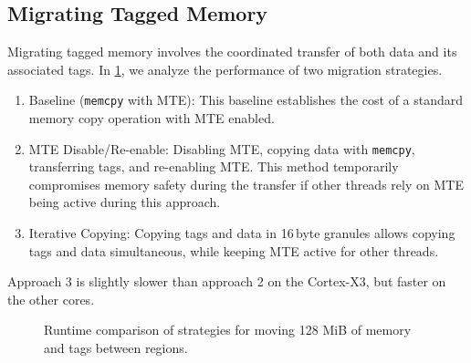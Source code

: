 \subsection{Migrating Tagged Memory}
\label{subsec:migrating-tagged-memory}

Migrating tagged memory involves the coordinated transfer of both data and its associated tags.
In \cref{fig:migrate-performance}, we analyze the performance of two migration strategies.

\begin{enumerate}
    \item Baseline (\texttt{memcpy} with \ac{MTE}): This baseline establishes the cost of a standard memory copy operation with \ac{MTE} enabled.
    \item \ac{MTE} Disable/Re-enable: Disabling \ac{MTE}, copying data with \texttt{memcpy}, transferring tags, and re-enabling \ac{MTE}.
    This method temporarily compromises memory safety during the transfer if other threads rely on \ac{MTE} being active during this approach.
    \item Iterative Copying: Copying tags and data in 16\,byte granules allows copying tags and data simultaneous, while keeping \ac{MTE} active for other threads.
\end{enumerate}

Approach 3 is slightly slower than approach 2 on the Cortex-X3, but faster on the other cores.

\begin{figure}[h]
    \centering
    
    \caption{Runtime comparison of strategies for moving 128 MiB of memory and tags between regions.}
    \label{fig:migrate-performance}
\end{figure}
